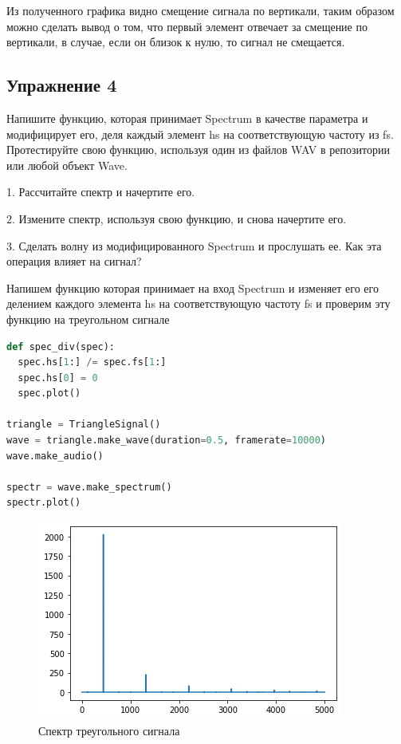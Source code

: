Из полученного графика видно смещение сигнала по вертикали, таким образом можно сделать вывод о том, что первый элемент отвечает за смещение по вертикали, в случае, если он близок к нулю, то сигнал не смещается.

\subsection{Упражнение 4}

Напишите функцию, которая принимает Spectrum в качестве параметра и модифицирует его, деля каждый элемент hs на соответствующую частоту из fs. Протестируйте свою функцию, используя один из файлов WAV в репозитории или любой объект Wave.

1. Рассчитайте спектр и начертите его.

2. Измените спектр, используя свою функцию, и снова начертите его.

3. Сделать волну из модифицированного Spectrum и прослушать ее. Как эта операция влияет на сигнал?


Напишем функцию которая принимает на вход Spectrum и изменяет его его делением каждого элемента hs на соответствующую частоту fs и проверим эту функцию на треугольном сигнале

\begin{lstlisting}[language=Python]
def spec_div(spec):
  spec.hs[1:] /= spec.fs[1:]
  spec.hs[0] = 0
  spec.plot()

triangle = TriangleSignal()
wave = triangle.make_wave(duration=0.5, framerate=10000)
wave.make_audio()

spectr = wave.make_spectrum()
spectr.plot()
\end{lstlisting}

\begin{figure}[H]
	\begin{center}
		\includegraphics[scale=1]{fig/lab02/lab02_8.png}
		\caption{Спектр треугольного сигнала}
	\end{center}
\end{figure}

